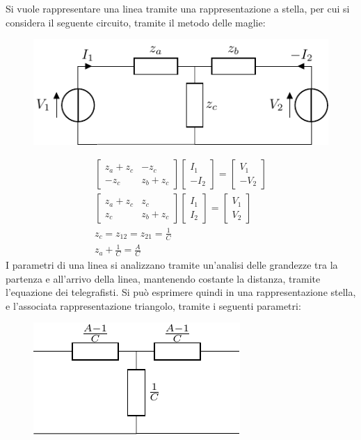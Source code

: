 \documentclass{article}
\numberwithin{equation}{subsection}
\begin{document}
Si vuole rappresentare una linea tramite una rappresentazione a stella, per cui si considera il seguente circuito, tramite il metodo delle maglie:
\begin{figure}[H]%
    \centering
    \includegraphics{rappresentazione-stella-entrate-trasmissione-diretta.pdf}%
    \label{fig:rappresentazone-stella-parametri-diretti}
\end{figure}
\begin{gather*}
    \begin{bmatrix}
        z_a+z_c&-z_c\\-z_c&z_b+z_c
    \end{bmatrix}\begin{bmatrix}
        I_1\\-I_2
    \end{bmatrix}=\begin{bmatrix}
        V_1\\-V_2
    \end{bmatrix}\\
    \begin{bmatrix}
        z_a+z_c&z_c\\z_c&z_b+z_c
    \end{bmatrix}\begin{bmatrix}
        I_1\\I_2
    \end{bmatrix}=\begin{bmatrix}
        V_1\\V_2
    \end{bmatrix}\\
    z_c=z_{12}=z_{21}=\displaystyle\frac{1}{C}\\
    z_a+\displaystyle\frac{1}{C}=\frac{A}{C}
\end{gather*}
I parametri di una linea si analizzano tramite un'analisi delle grandezze tra la partenza e all'arrivo della linea, mantenendo costante la distanza, tramite l'equazione 
dei telegrafisti. Si può esprimere quindi in una rappresentazione stella, e l'associata rappresentazione triangolo, tramite i seguenti parametri:
\begin{figure}[H]%
    \centering
    \includegraphics{rappresentazione-parametri-diretti-stella.pdf}%
    \label{fig:rappresentazione-parametri-diretti-stella}
\end{figure}
\end{document}
